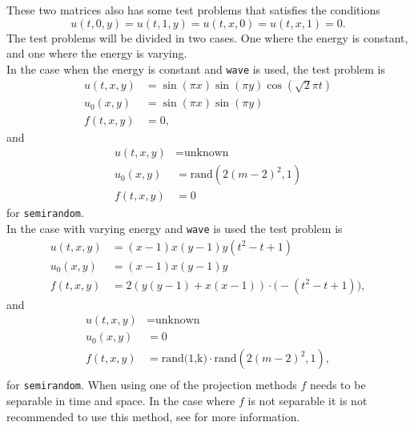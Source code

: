 These two matrices also has some test problems that satisfies the conditions $$u(t,0,y) = u(t,1,y) = u(t,x,0) = u(t,x,1) = 0.$$ The test problems will be divided in two cases. One where the energy is constant, and one where the energy is varying. \\

In the case when the energy is constant and \texttt{wave} is used, the test problem is 
\begin{equation}
\begin{aligned}
u(t,x,y) &= \sin(\pi x) \sin(\pi y) \cos(\sqrt{2} \pi t) \\
u_0(x,y) &= \sin( \pi x) \sin(\pi y) \\
f(t,x,y) &= 0 ,
\end{aligned}
\end{equation}
and 
\begin{equation}
\begin{aligned}
u(t,x,y) &= \text{unknown} \\
u_0(x,y) &= \text{rand} (2 (m-2)^2,1) \\
f(t,x,y) &= 0
\end{aligned}
\end{equation}
for \texttt{semirandom}.\\ %

In the case with varying energy and \texttt{wave} is used the test problem is 
\begin{equation}
\begin{aligned}
u(t,x,y) &= (x-1)x(y-1)y(t^2-t+1) \\
u_0(x,y) &= (x-1)x(y-1)y \\
f(t,x,y) &= 2 (y (y-1) + x (x-1)) \cdot \big( -(t^2-t+1) \big) ,
\end{aligned}
\end{equation}
and 
\begin{equation}
\begin{aligned}
u(t,x,y) &= \text{unknown} \\
u_0(x,y) &= 0 \\
f(t,x,y) &= \text{rand(1,k)} \cdot  \text{rand} (2 (m-2)^2,1), \\
\end{aligned}
\end{equation}
for \texttt{semirandom}. When using one of the projection methods $f$ needs to be separable in time and space. In the case where $f$ is not separable it is not recommended to use this method, see \cite{min} for more information.\\

